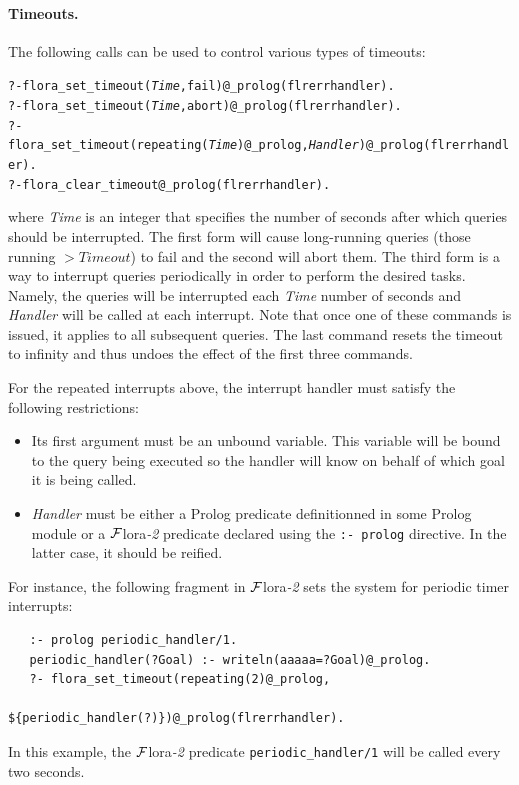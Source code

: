 \documentclass[11pt]{article}
\newcommand{\FLORA}{{\mbox{\sc ${\cal F}${lora}\rm\emph{-2}}}\xspace}
\begin{document}
\paragraph{Timeouts.} The following calls can be used to control various
types of timeouts:
\begin{alltt}
    ?- flora_set_timeout(\emph{Time},fail)@_prolog(flrerrhandler).
    ?- flora_set_timeout(\emph{Time},abort)@_prolog(flrerrhandler).
    ?- flora_set_timeout(repeating(\emph{Time})@_prolog,\emph{Handler})@_prolog(flrerrhandler).
    ?- flora_clear_timeout@_prolog(flrerrhandler).
\end{alltt}
where \emph{Time} is an integer that specifies the number of seconds after
which queries should be interrupted. The first form will cause long-running
queries (those running $> Timeout$) to fail and the second will abort them.
The third form is a way to interrupt queries periodically in order to
perform the desired tasks. Namely, the queries will be interrupted each
\emph{Time} number of seconds and \emph{Handler} will be called at each
interrupt.
Note that once one of these
commands is issued, it applies to all subsequent queries.
The last command resets the timeout to infinity and thus undoes the
effect of the first three commands.

For the repeated interrupts above, the interrupt handler must satisfy the
following restrictions:
\begin{itemize}
\item   Its first argument must be an unbound variable. This variable will
  be bound to the query being executed so the handler will know on behalf
  of which goal it is being called.
\item \emph{Handler} must be either a Prolog predicate definitionned in some
  Prolog module or a \FLORA predicate declared using the \texttt{:- prolog}  
  directive. In the latter case, it should be reified.
\end{itemize}
For instance, the following fragment in \FLORA sets the system for periodic
timer interrupts:
\begin{verbatim}
   :- prolog periodic_handler/1.
   periodic_handler(?Goal) :- writeln(aaaaa=?Goal)@_prolog.
   ?- flora_set_timeout(repeating(2)@_prolog,
                        ${periodic_handler(?)})@_prolog(flrerrhandler).
\end{verbatim}
In this example, the \FLORA predicate \texttt{periodic\_handler/1} will be
called every two seconds. 
\end{document}
